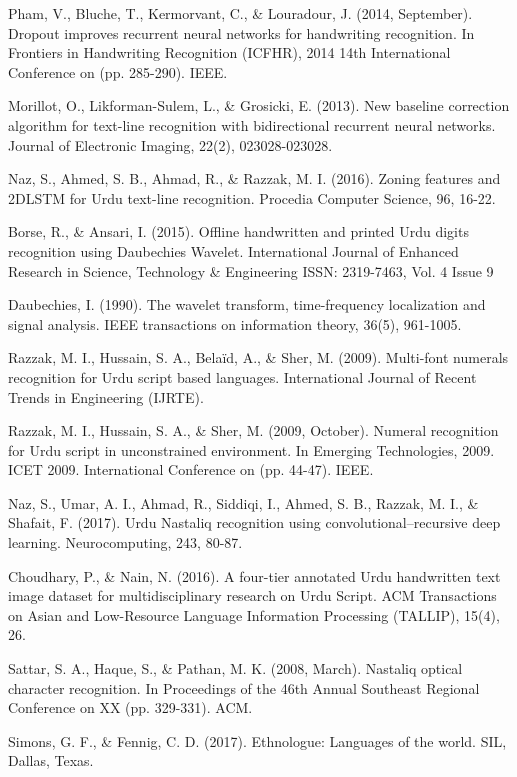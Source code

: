 \begin{thebibliography}{130}
Pham, V., Bluche, T., Kermorvant, C., \& Louradour, J. (2014, September). Dropout improves recurrent neural networks for handwriting recognition. In Frontiers in Handwriting Recognition (ICFHR), 2014 14th International Conference on (pp. 285-290). IEEE.

Morillot, O., Likforman-Sulem, L., \& Grosicki, E. (2013). New baseline correction algorithm for text-line recognition with bidirectional recurrent neural networks. Journal of Electronic Imaging, 22(2), 023028-023028.

Naz, S., Ahmed, S. B., Ahmad, R., \& Razzak, M. I. (2016). Zoning features and 2DLSTM for Urdu text-line recognition. Procedia Computer Science, 96, 16-22.

Borse, R., \& Ansari, I. (2015). Offline handwritten and printed Urdu digits recognition using Daubechies Wavelet. International Journal of Enhanced Research in Science, Technology \& Engineering
ISSN: 2319-7463, Vol. 4 Issue 9

Daubechies, I. (1990). The wavelet transform, time-frequency localization and signal analysis. IEEE transactions on information theory, 36(5), 961-1005.

Razzak, M. I., Hussain, S. A., Belaïd, A., \& Sher, M. (2009). Multi-font numerals recognition for Urdu script based languages. International Journal of Recent Trends in Engineering (IJRTE).

Razzak, M. I., Hussain, S. A., \& Sher, M. (2009, October). Numeral recognition for Urdu script in unconstrained environment. In Emerging Technologies, 2009. ICET 2009. International Conference on (pp. 44-47). IEEE.

Naz, S., Umar, A. I., Ahmad, R., Siddiqi, I., Ahmed, S. B., Razzak, M. I., \& Shafait, F. (2017). Urdu Nastaliq recognition using convolutional–recursive deep learning. Neurocomputing, 243, 80-87.

Choudhary, P., \& Nain, N. (2016). A four-tier annotated Urdu handwritten text image dataset for multidisciplinary research on Urdu Script. ACM Transactions on Asian and Low-Resource Language Information Processing (TALLIP), 15(4), 26.

Sattar, S. A., Haque, S., \& Pathan, M. K. (2008, March). Nastaliq optical character recognition. In Proceedings of the 46th Annual Southeast Regional Conference on XX (pp. 329-331). ACM.

Simons, G. F., \& Fennig, C. D. (2017). Ethnologue: Languages of the world. SIL, Dallas, Texas.


\end{thebibliography}
